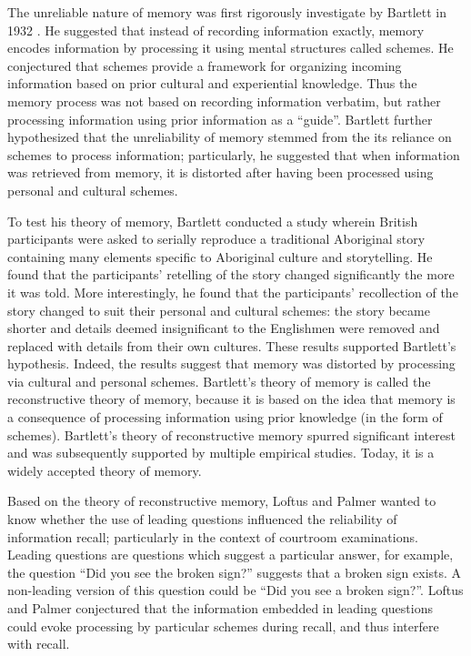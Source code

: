 \documentclass[a4paper,11pt]{report}
\begin{document}
The unreliable nature of memory was first rigorously investigate by Bartlett in
1932 \cite{bartlett}. He suggested that instead of recording information
exactly, memory encodes information by processing it using mental structures
called schemes. He conjectured that schemes provide a framework for organizing
incoming information based on prior cultural and experiential knowledge. Thus
the memory process was not based on recording information verbatim, but rather
processing information using prior information as a “guide”. Bartlett further
hypothesized that the unreliability of memory stemmed from the its reliance on
schemes to process information; particularly, he suggested that when
information was retrieved from memory, it is distorted after having been
processed using personal and cultural schemes.

To test his theory of memory, Bartlett conducted a study wherein British
participants were asked to serially reproduce a traditional Aboriginal story
containing many elements specific to Aboriginal culture and storytelling. He
found that the participants’ retelling of the story changed significantly the
more it was told. More interestingly, he found that the participants’
recollection of the story changed to suit their personal and cultural schemes:
the story became shorter and details deemed insignificant to the Englishmen
were removed and replaced with details from their own cultures. These results
supported Bartlett’s hypothesis. Indeed, the results suggest that memory was
distorted by processing via cultural and personal schemes. Bartlett’s theory of
memory is called the reconstructive theory of memory, because it is based on
the idea that memory is a consequence of processing information using prior
knowledge (in the form of schemes). Bartlett’s theory of reconstructive memory
spurred significant interest and was subsequently supported by multiple
empirical studies. Today, it is a widely accepted theory of memory.

Based on the theory of reconstructive memory, Loftus and Palmer wanted to know
whether the use of leading questions influenced the reliability of information
recall; particularly in the context of courtroom examinations. Leading
questions are questions which suggest a particular answer, for example, the
question “Did you see the broken sign?” suggests that a broken sign exists. A
non-leading version of this question could be “Did you see a broken sign?”.
Loftus and Palmer conjectured that the information embedded in leading
questions could evoke processing by particular schemes during recall, and thus
interfere with recall.
\end{document}
